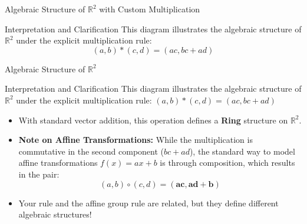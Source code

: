 \documentclass[11pt,aspectratio=43,ignorenonframetext,t]{beamer}
\begin{document}
\begin{frame}{Algebraic Structure of $\mathbb{R}^2$ with Custom Multiplication}
\vspace{-0.3cm}
\begin{center}
\end{center}
\begin{block}{Interpretation and Clarification}
This diagram illustrates the algebraic structure of $\mathbb{R}^2$ under the explicit multiplication rule:
$$(a, b) * (c, d) = (ac, bc + ad)$$
\end{block}
\end{frame}

\begin{frame}{Algebraic Structure of $\mathbb{R}^2$}
\vspace{-0.3cm}
\begin{block}{Interpretation and Clarification}
This diagram illustrates the algebraic structure of $\mathbb{R}^2$ under the explicit multiplication rule:
$(a, b) * (c, d) = (ac, bc + ad)$
\begin{itemize}
    \item With standard vector addition, this operation defines a \textbf{Ring} structure on $\mathbb{R}^2$.
    \item \textbf{Note on Affine Transformations:} While the multiplication is commutative in the second component ($bc+ad$), the standard way to model affine transformations $f(x) = ax+b$ is through composition, which results in the pair:
    $$(a,b) \circ (c,d) = (\mathbf{ac}, \mathbf{ad+b})$$
    \item Your rule and the affine group rule are related, but they define different algebraic structures!
\end{itemize}
\end{block}
\end{frame}
\end{document}
